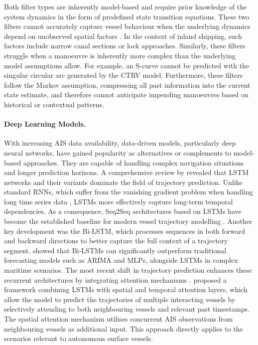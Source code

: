 Both filter types are inherently model-based and require prior knowledge of the system dynamics in the form of predefined state transition equations.
These two filters cannot accurately capture vessel behaviour when the underlying dynamics depend on unobserved spatial factors %
\parencite{articlebilstmsus}. 
In the context of inland shipping, such factors include narrow canal sections or lock approaches.
Similarly, these filters struggle when a manoeuvre is inherently more complex than the underlying model assumptions allow.
For example, an S-curve cannot be predicted with the singular circular arc generated by the \acs{CTRV} model.
Furthermore, these filters follow the Markov assumption, compressing all past information into the current state estimate, and therefore cannot anticipate impending manoeuvres based on historical or contextual patterns.


\paragraph{Deep Learning Models.} 
With increasing \ac{AIS} data availability, data-driven models, particularly deep neural networks, have gained popularity as alternatives or complements to model-based approaches. 
They are capable of handling complex navigation situations and longer prediction horizons. 
A comprehensive review by \textcite{Zhang22} revealed that \ac{LSTM} networks and their variants dominate the field of trajectory prediction.
Unlike standard \acp{RNN}, which suffer from the vanishing gradient problem when handling long time series data \parencite{279181bengio}, \acp{LSTM} more effectively capture long-term temporal dependencies. As a consequence, \ac{Seq2Seq} architectures based on \acp{LSTM} have become the established baseline for modern vessel trajectory modelling \parencite{donandt2022shortterm, Zhang22}.
Another key development was the \ac{Bi-LSTM}, which processes sequences in both forward and backward directions to better capture the full context of a trajectory segment.
\textcite{articlebilstmsus} showed that \acp{Bi-LSTM} can significantly outperform traditional forecasting models such as \ac{ARIMA} and \acp{MLP}, alongside \acp{LSTM} in complex maritime scenarios.
The most recent shift in trajectory prediction enhances these recurrent architectures by integrating attention mechanisms \parencite{Zhang22}.
\textcite{sekhon2020} proposed a framework combining \acp{LSTM} with spatial and temporal attention layers, which allow the model to predict the trajectories of multiple interacting vessels by selectively attending to both neighbouring vessels and relevant past timestamps.
The spatial attention mechanism utilises concurrent \ac{AIS} observations from neighbouring vessels as additional input. This approach directly applies to the scenarios relevant to autonomous surface vessels.

